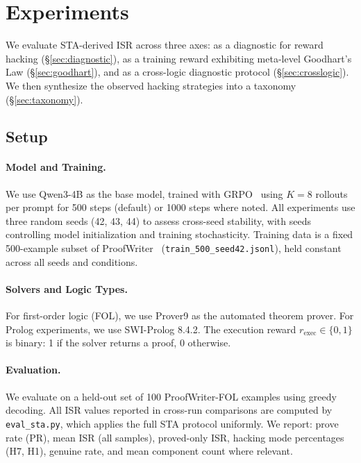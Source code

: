 \section{Experiments}
\label{sec:experiments}

We evaluate STA-derived ISR across three axes: as a diagnostic for reward hacking (\S\ref{sec:diagnostic}), as a training reward exhibiting meta-level Goodhart's Law (\S\ref{sec:goodhart}), and as a cross-logic diagnostic protocol (\S\ref{sec:crosslogic}). We then synthesize the observed hacking strategies into a taxonomy (\S\ref{sec:taxonomy}).

\subsection{Setup}
\label{sec:setup}

\paragraph{Model and Training.}
We use Qwen3-4B as the base model, trained with GRPO~\cite{deepseekmath} using $K{=}8$ rollouts per prompt for 500 steps (default) or 1000 steps where noted. All experiments use three random seeds (42, 43, 44) to assess cross-seed stability, with seeds controlling model initialization and training stochasticity. Training data is a fixed 500-example subset of ProofWriter~\cite{proofwriter} (\texttt{train\_500\_seed42.jsonl}), held constant across all seeds and conditions.

\paragraph{Solvers and Logic Types.}
For first-order logic (FOL), we use Prover9 as the automated theorem prover. For Prolog experiments, we use SWI-Prolog 8.4.2. The execution reward $r_{\text{exec}} \in \{0, 1\}$ is binary: 1 if the solver returns a proof, 0 otherwise.

\paragraph{Evaluation.}
We evaluate on a held-out set of 100 ProofWriter-FOL examples using greedy decoding. All ISR values reported in cross-run comparisons are computed by \texttt{eval\_sta.py}, which applies the full STA protocol uniformly. We report: prove rate (PR), mean ISR (all samples), proved-only ISR, hacking mode percentages (H7, H1), genuine rate, and mean component count where relevant.

